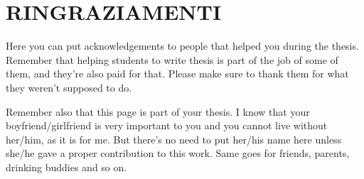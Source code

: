 
\bigskip

\begingroup
\let\clearpage\relax
\let\cleardoublepage\relax
\let\cleardoublepage\relax
\chapter*{RINGRAZIAMENTI}
Here you can put acknowledgements to people that helped you during the thesis. Remember that helping students to write thesis is part of the job of some of them, and they're also paid for that. Please make sure to thank them for what they weren't supposed to do.

Remember also that this page is part of your thesis. I know that your boyfriend/girlfriend is very important to you and you cannot live without her/him, as it is for me. But there's no need to put her/his name here unless she/he gave a proper contribution to this work. Same goes for friends, parents, drinking buddies and so on.

\endgroup